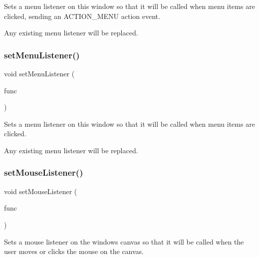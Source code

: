 Sets a menu listener on this window so that it will be called when menu items are clicked, sending an A\+C\+T\+I\+O\+N\+\_\+\+M\+E\+NU action event. 

Any existing menu listener will be replaced. \mbox{\label{classGWindow_a1294d48e67c30207da71c3e3ab56abde}} 
\subsubsection{\texorpdfstring{set\+Menu\+Listener()}{setMenuListener()}\hspace{0.1cm}{\footnotesize\ttfamily [2/2]}}
{\footnotesize\ttfamily void set\+Menu\+Listener (\begin{DoxyParamCaption}\item[{G\+Event\+Listener\+Void}]{func }\end{DoxyParamCaption})\hspace{0.3cm}{\ttfamily [virtual]}}



Sets a menu listener on this window so that it will be called when menu items are clicked. 

Any existing menu listener will be replaced. \mbox{\label{classGWindow_a37d8dbc943f59920f705b0104f60bde2}} 
\subsubsection{\texorpdfstring{set\+Mouse\+Listener()}{setMouseListener()}\hspace{0.1cm}{\footnotesize\ttfamily [1/2]}}
{\footnotesize\ttfamily void set\+Mouse\+Listener (\begin{DoxyParamCaption}\item[{G\+Event\+Listener}]{func }\end{DoxyParamCaption})\hspace{0.3cm}{\ttfamily [virtual]}}



Sets a mouse listener on the window\textquotesingle{}s canvas so that it will be called when the user moves or clicks the mouse on the canvas. 

